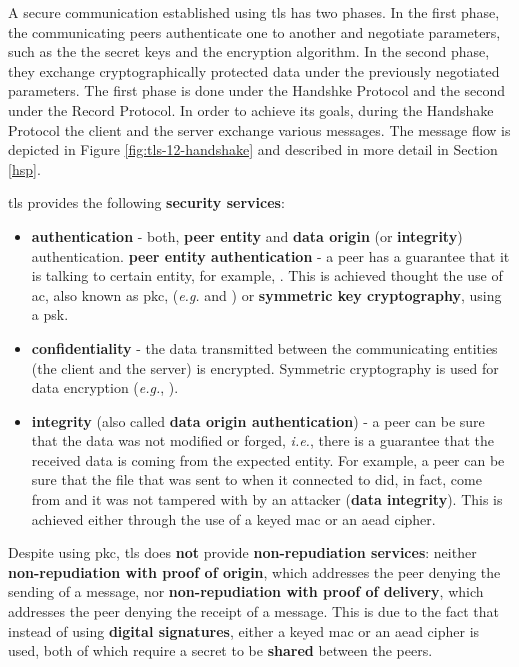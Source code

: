 \documentclass{llncs}
\begin{document}
{A secure communication established using \gls{tls} has two phases. In the first
phase, the communicating peers authenticate one to another and negotiate parameters, such as the the secret keys and the encryption algorithm. In the
second phase, they exchange cryptographically protected data under
the previously negotiated parameters. The first phase is done under the
Handshke Protocol and the second under the Record Protocol. In order to
achieve its goals, during the Handshake Protocol the client and the server
exchange various messages. The message flow is depicted in Figure \ref{fig:tls-12-handshake} and described in more detail in Section
\ref{hsp}.

\gls{tls} provides the following \textbf{security services}:
\begin{itemize}
\item \textbf{authentication} - both, \textbf{peer entity} and \textbf{data origin} (or \textbf{integrity})
authentication.
\subitem \textbf{peer entity authentication} - a peer has a guarantee that it is talking to certain entity, for example, .
This is achieved thought the use of \gls{ac}, also known as \gls{pkc}, (\textit{e.g.}  and )
or \textbf{symmetric key cryptography}, using a \gls{psk}.
\item \textbf{confidentiality} - the data transmitted between the communicating
entities (the client and the server) is encrypted. Symmetric cryptography is
used for data encryption (\textit{e.g.}, ).
\item \textbf{integrity} (also called \textbf{data origin authentication}) - a peer can be sure that the data was not modified or forged,
\textit{i.e.}, there is a guarantee that the received data is coming from the expected entity. For example, a peer can be sure
that the  file that was sent to when it connected to  did, in fact,
come from  and it was not tampered with by an attacker (\textbf{data integrity}). This is achieved either through the use
of a keyed \gls{mac} or an \gls{aead} cipher.
\end{itemize}

Despite using \gls{pkc}, \gls{tls} does \textbf{not} provide \textbf{non-repudiation services}:
neither \textbf{non-repudiation with proof of origin}, which addresses the peer denying
the sending of a message, nor \textbf{non-repudiation with proof of delivery}, which
addresses the peer denying the receipt of a message. This is due to the fact that
instead of using \textbf{digital signatures}, either a keyed \gls{mac} or an \gls{aead}
cipher is used, both of which require a secret to be \textbf{shared} between the peers.

}
\end{document}
